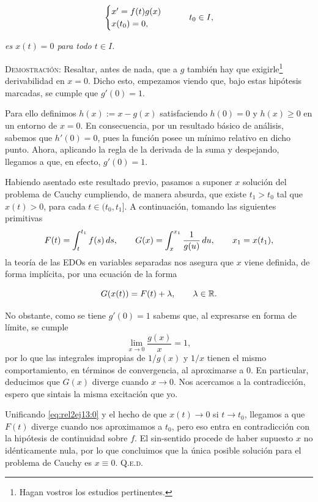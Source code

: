 \documentclass{article}
\begin{document}
\begin{enumerate}
    \[
    \begin{cases}
        x' = f(t)g(x) \\
        x(t_0) = 0,
    \end{cases}
    \hspace{20px}
    t_0 \in I,
    \]

    \textit{es $x(t) = 0$ para todo $t \in I$.}

    \vspace{7px}

    \textsc{Demostración}: Resaltar, antes de nada, que a $g$ también hay que exigirle\footnote{Hagan vostros los estudios pertinentes.} derivabilidad en $x = 0$. Dicho esto, empezamos viendo que, bajo estas hipótesis marcadas, se cumple que $g'(0) = 1$. 
    
    Para ello definimos $h(x) := x - g(x)$ satisfaciendo $h(0) = 0$ y $h(x) \geq 0$ en un entorno de $x = 0$. En consecuencia, por un resultado básico de análisis, sabemos que $h'(0) = 0$, pues la función posee un mínimo relativo en dicho punto.
    Ahora, aplicando la regla de la derivada de la suma y despejando, llegamos a que, en efecto, $g'(0) = 1$.

    Habiendo asentado este resultado previo, pasamos a suponer $x$ solución del problema de Cauchy cumpliendo, de manera absurda, que existe $t_1 > t_0$ tal que $x(t) > 0$, para cada $t \in (t_0, t_1]$. A continuación, tomando las siguientes primitivas \[F(t) = \int_{t}^{t_1} f(s)\,ds, \hspace{20px} G(x) = \int_{x}^{x_1} \frac{1}{g(u)}\,du, \hspace{20px} x_1 = x(t_1),\]
    la teoría de las EDOs en variables separadas nos asegura que $x$ viene definida, de forma implícita, por una ecuación de la forma

    \begin{equation}
        G(x(t)) = F(t) + \lambda, \hspace{20px} \lambda \in \mathbb{R}.
        \label{eq:rel2ej13:0}
    \end{equation}

    No obstante, como se tiene $g'(0) = 1$ sabems que, al expresarse en forma de límite, se cumple \[\lim_{x \to 0} \frac{g(x)}{x} = 1,\] por lo que las integrales impropias de $1/g(x)$ y $1/x$ tienen el mismo comportamiento, en términos de convergencia, al aproximarse a $0$. En particular, deducimos que $G(x)$ diverge cuando $x \to 0$. Nos acercamos a la contradicción, espero que sintais la misma excitación que yo.

    Unificando \eqref{eq:rel2ej13:0} y el hecho de que $x(t) \to 0$ si $t \to t_0$, llegamos a que $F(t)$ diverge cuando nos aproximamos a $t_0$, pero eso entra en contradicción con la hipótesis de continuidad sobre $f$. El sin-sentido procede de haber supuesto $x$ no idénticamente nula, por lo que concluimos que la única posible solución para el problema de Cauchy es $x \equiv 0$. \hfill{\textsc{Q.e.d.}}
\end{enumerate}
\end{document}
